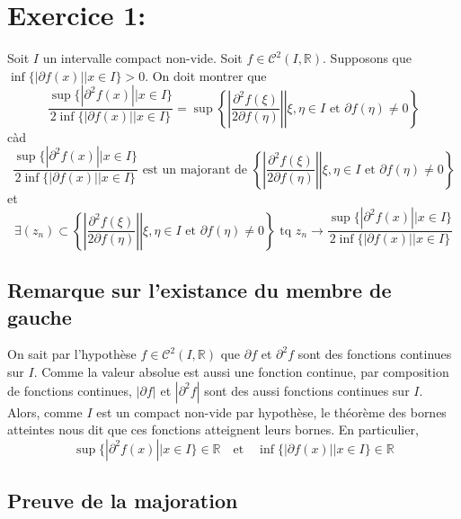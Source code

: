 \documentclass[a4paper, 12pt]{article}
\begin{document}
\newpage
\tableofcontents

\newpage
\section{Exercice 1:}

Soit \( I \) un intervalle compact non-vide. Soit \( f \in \mathcal{C}^2(I, \mathbb{R}) \). Supposons que \( \inf\{|\partial f(x)| | x \in I\} > 0 \). On doit montrer que
$$
\frac{\sup \{ | \partial^2 f(x) || x \in I \}}{2 \inf \{ |\partial f(x)|| x \in I \}}
= \sup \left\{ \left. \left| \frac{\partial^2f(\xi)}{2\partial f(\eta)} \right| \right| \xi, \eta \in I \text{ et } \partial f(\eta) \neq 0 \right\}
$$
càd
\begin{equation}
    \label{eq:1.maj}
    \frac{\sup \{ | \partial^2 f(x) || x \in I \}}{2 \inf \{ |\partial f(x)|| x \in I \}} \text{ est un majorant de }
    \left\{ \left. \left| \frac{\partial^2f(\xi)}{2\partial f(\eta)} \right| \right| \xi, \eta \in I \text{ et } \partial f(\eta) \neq 0 \right\}
\end{equation}
et
\begin{equation}
    \label{eq:1.conv}
    \exists (z_n) \subset
    \left\{ \left. \left| \frac{\partial^2f(\xi)}{2\partial f(\eta)} \right| \right| \xi, \eta \in I \text{ et } \partial f(\eta) \neq 0 \right\}
    \text{ tq } z_n \to
    \frac{\sup \{ | \partial^2 f(x) || x \in I \}}{2 \inf \{ |\partial f(x)|| x \in I \}}
\end{equation}

\subsection{Remarque sur l'existance du membre de gauche}

On sait par l'hypothèse \( f \in \mathcal{C}^2(I, \mathbb{R}) \) que \( \partial f \) et \( \partial^2 f \) sont des fonctions continues sur \( I \). Comme la valeur absolue est aussi une fonction continue, par composition de fonctions continues, \( | \partial f | \) et \( | \partial^2 f | \) sont des aussi fonctions continues sur \( I \). \\
Alors, comme \( I \) est un compact non-vide par hypothèse, le théorème des bornes atteintes nous dit que ces fonctions atteignent leurs bornes. En particulier,
$$
\sup \{ | \partial^2 f(x) || x \in I \} \in \mathbb{R} \quad \text{et} \quad 
\inf \{ |\partial f(x)|| x \in I \} \in \mathbb{R}
$$

\subsection{Preuve de la majoration}
\end{document}
